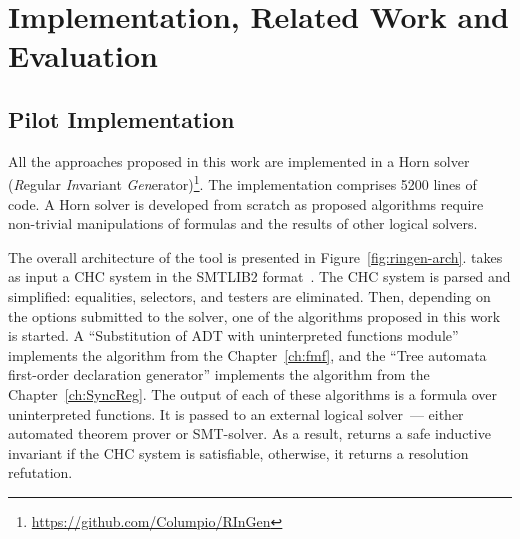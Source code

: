\chapter{Implementation, Related Work and Evaluation}\label{ch:evaluation}

\section{Pilot Implementation}\label{sec:implementation}
All the approaches proposed in this work are implemented in a Horn solver \theringen{} (\emph{R}egular \emph{In}variant \emph{Gen}erator)\footnote{\url{https://github.com/Columpio/RInGen}}.
The implementation comprises 5200 lines of \fsharp{} code. A Horn solver is developed from scratch as proposed algorithms require non-trivial manipulations of formulas and the results of other logical solvers.

The overall architecture of the tool is presented in Figure~\ref{fig:ringen-arch}.
\theringen{} takes as input a CHC system in the SMTLIB2 format~\cite{BarFT-RR-17}.
The CHC system is parsed and simplified: equalities, selectors, and testers are eliminated. Then, depending on the options submitted to the solver, one of the algorithms proposed in this work is started.
A ``Substitution of ADT with uninterpreted functions module'' implements the algorithm from the Chapter~\ref{ch:fmf}, and the ``Tree automata first-order declaration generator'' implements the algorithm from the Chapter~\ref{ch:SyncReg}.
The output of each of these algorithms is a formula over uninterpreted functions. It is passed to an external logical solver~--- either \vampire{} automated theorem prover or \cvc{} SMT-solver.
As a result, \theringen{} returns a safe inductive invariant if the CHC system is satisfiable, otherwise, it returns a resolution refutation.

